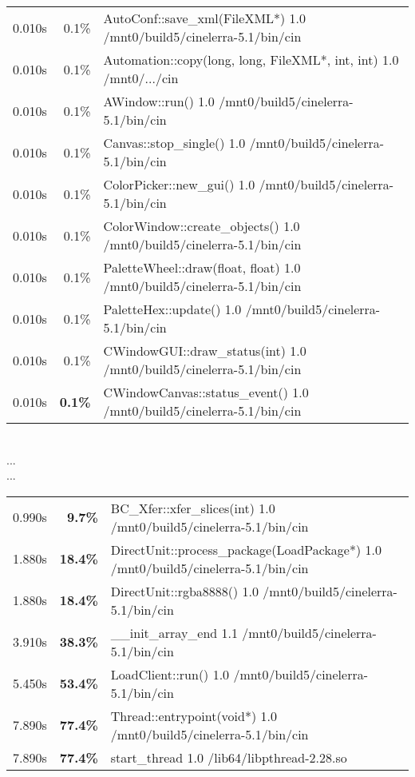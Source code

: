 \begin{tabular}{@{}rrl}
 0.010s & 0.1\% & AutoConf::save\_xml(FileXML*)   1.0 /mnt0/build5/cinelerra-5.1/bin/cin\\
 0.010s & 0.1\% & Automation::copy(long, long, FileXML*, int, int)   1.0 /mnt0/.../cin\\
 0.010s & 0.1\% & AWindow::run()             1.0 /mnt0/build5/cinelerra-5.1/bin/cin\\
 0.010s & 0.1\% & Canvas::stop\_single()      1.0 /mnt0/build5/cinelerra-5.1/bin/cin\\
 0.010s & 0.1\% & ColorPicker::new\_gui()     1.0 /mnt0/build5/cinelerra-5.1/bin/cin\\
 0.010s & 0.1\% & ColorWindow::create\_objects()   1.0 /mnt0/build5/cinelerra-5.1/bin/cin\\
 0.010s & 0.1\% & PaletteWheel::draw(float, float)   1.0 /mnt0/build5/cinelerra-5.1/bin/cin\\
 0.010s & 0.1\% & PaletteHex::update()       1.0 /mnt0/build5/cinelerra-5.1/bin/cin\\
 0.010s & 0.1\% & CWindowGUI::draw\_status(int)   1.0 /mnt0/build5/cinelerra-5.1/bin/cin\\
 0.010s & \textbf{0.1\%} & CWindowCanvas::status\_event()   1.0 /mnt0/build5/cinelerra-5.1/bin/cin\\
\end{tabular}\\
...\\
...\\
\begin{tabular}{@{}rrl}
 0.990s & \textbf{9.7\%} & BC\_Xfer::xfer\_slices(int)   1.0 /mnt0/build5/cinelerra-5.1/bin/cin\\
 1.880s & \textbf{18.4\%} & DirectUnit::process\_package(LoadPackage*)   1.0 /mnt0/build5/cinelerra-5.1/bin/cin\\
 1.880s & \textbf{18.4\%} & DirectUnit::rgba8888()     1.0 /mnt0/build5/cinelerra-5.1/bin/cin\\
 3.910s & \textbf{38.3\%} & \_\_init\_array\_end           1.1 /mnt0/build5/cinelerra-5.1/bin/cin\\
 5.450s & \textbf{53.4\%} & LoadClient::run()          1.0 /mnt0/build5/cinelerra-5.1/bin/cin\\
 7.890s & \textbf{77.4\%} & Thread::entrypoint(void*)   1.0 /mnt0/build5/cinelerra-5.1/bin/cin\\
 7.890s & \textbf{77.4\%} & start\_thread               1.0 /lib64/libpthread-2.28.so\\
\end{tabular}\\
